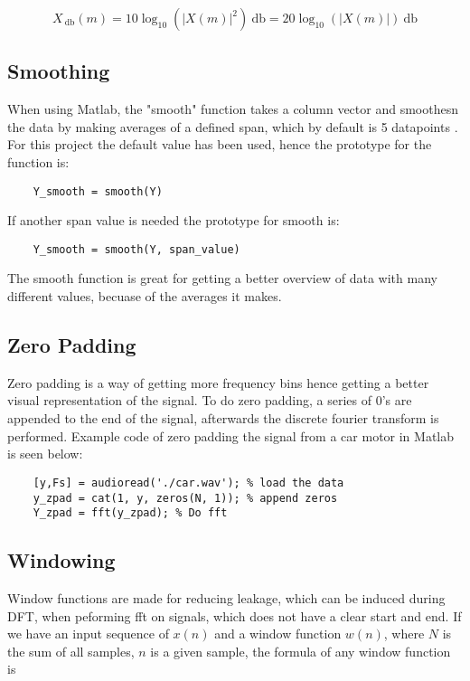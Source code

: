 \begin{equation}
X_{\SI{}{\decibel}}(m) = 10\log_{10}(|X(m)|^2)\SI{}{\decibel} = 20\log_{10}(|X(m)|)\SI{}{\decibel}
\end{equation}

\subsection{Smoothing}

When using Matlab, the "smooth" function takes a column vector and smoothesn the data by making averages of a defined span, which by default is 5 datapoints \cite[smooth]{MATLAB_DOC}. 
For this project the default value has been used, hence the prototype for the function is:

\begin{verbatim}
	Y_smooth = smooth(Y)
\end{verbatim}
If another span value is needed the prototype for smooth is:

\begin{verbatim}
	Y_smooth = smooth(Y, span_value)
\end{verbatim}

The smooth function is great for getting a better overview of data with many different values, becuase of the averages it makes. 

\subsection{Zero Padding}
Zero padding is a way of getting more frequency bins hence getting a better visual representation of the signal. 
To do zero padding, a series of 0's are appended to the end of the signal, afterwards the discrete fourier transform is performed. 
Example code of zero padding the signal from a car motor in Matlab is seen below:

\begin{verbatim}
	[y,Fs] = audioread('./car.wav'); % load the data
	y_zpad = cat(1, y, zeros(N, 1)); % append zeros
	Y_zpad = fft(y_zpad); % Do fft
\end{verbatim}

\subsection{Windowing}
\label{sec:windowing}
Window functions are made for reducing leakage, which can be induced during DFT, when peforming fft on signals, which does not have a clear start and end. If we have an input sequence of $x(n)$ and a window function $w(n)$, where $N$ is the sum of all samples, $n$ is a given sample, the formula of any window function is

